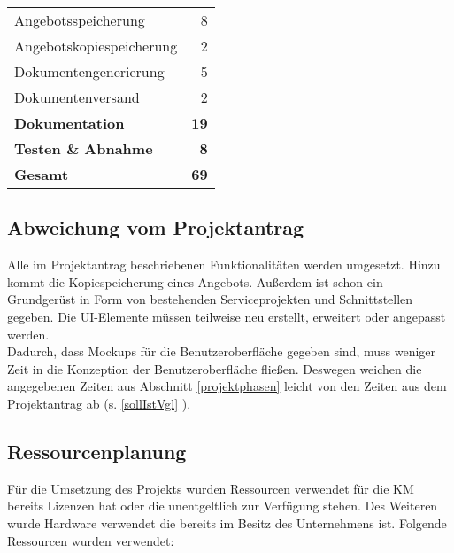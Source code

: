 \begin{center}
\begin{tabular}{|l|r|}
		\rowcolor{blue!10}Angebotsspeicherung                                      &                        8 \\
		\rowcolor{blue!10}Angebotskopiespeicherung                                 &                        2 \\
		\rowcolor{blue!10}Dokumentengenerierung                                    &                        5 \\
		\rowcolor{blue!10}Dokumentenversand                                        &                        2 \\
		\rowcolor{blue!50}\textbf{Dokumentation }                                  &             \textbf{ 19} \\
		\rowcolor{blue!50}\textbf{Testen \& Abnahme }                              &              \textbf{ 8} \\ \hline
		\rowcolor{blue!70}\textbf{Gesamt}                                          &             \textbf{ 69} \\ \hline
	\end{tabular}
\end{center}

\subsection{Abweichung vom Projektantrag}
\label{abweichung}
Alle im Projektantrag beschriebenen Funktionalitäten werden umgesetzt. Hinzu kommt die Kopiespeicherung eines Angebots. Außerdem ist schon ein Grundgerüst in Form von bestehenden Serviceprojekten und Schnittstellen gegeben. Die UI-Elemente müssen teilweise neu erstellt, erweitert oder angepasst werden.\\
Dadurch, dass Mockups für die Benutzeroberfläche gegeben sind, muss weniger Zeit in die Konzeption der Benutzeroberfläche fließen. Deswegen weichen die angegebenen Zeiten aus Abschnitt \ref{projektphasen}  leicht von den Zeiten aus dem Projektantrag ab (s. \ref{sollIstVgl} ). 
\subsection{Ressourcenplanung}
\label{ressourcenplanung}
Für die Umsetzung des Projekts wurden Ressourcen verwendet für die \ac{KM} bereits Lizenzen hat oder die unentgeltlich zur Verfügung stehen. Des Weiteren wurde Hardware verwendet die bereits im Besitz des Unternehmens ist.
Folgende Ressourcen wurden verwendet:

